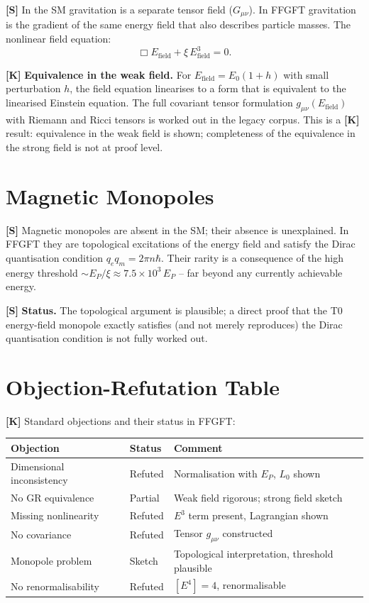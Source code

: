 \textbf{[S]} In the SM gravitation is a separate tensor field ($G_{\mu\nu}$). In
FFGFT gravitation is the gradient of the same energy field that also describes
particle masses. The nonlinear field equation:
\[
  \Box E_\text{field} + \xi\,E_\text{field}^3 = 0.
\]

\textbf{[K]} \textbf{Equivalence in the weak field.} For $E_\text{field}=E_0(1+h)$
with small perturbation $h$, the field equation linearises to a form that is
equivalent to the linearised Einstein equation. The full covariant tensor
formulation $g_{\mu\nu}(E_\text{field})$ with Riemann and Ricci tensors is worked
out in the legacy corpus. This is a \textbf{[K]} result: equivalence in the weak
field is shown; completeness of the equivalence in the strong field is not at
proof level.

\section{Magnetic Monopoles}

\textbf{[S]} Magnetic monopoles are absent in the SM; their absence is unexplained.
In FFGFT they are topological excitations of the energy field and satisfy the Dirac
quantisation condition $q_e q_m = 2\pi n\hbar$. Their rarity is a consequence of
the high energy threshold $\sim E_P/\xi\approx7{.}5\times10^3\,E_P$ -- far beyond
any currently achievable energy.

\textbf{[S]} \textbf{Status.} The topological argument is plausible; a direct
proof that the T0 energy-field monopole exactly satisfies (and not merely
reproduces) the Dirac quantisation condition is not fully worked out.

\section{Objection-Refutation Table}

\textbf{[K]} Standard objections and their status in FFGFT:

\begin{center}
\renewcommand{\arraystretch}{1.3}
{\small\setlength\tabcolsep{4pt}
\begin{tabular}{p{5.5cm}lp{5cm}}
\toprule
Objection & Status & Comment \\
\midrule
Dimensional inconsistency & Refuted & Normalisation with $E_P$, $L_0$ shown \\
No GR equivalence & Partial & Weak field rigorous; strong field sketch \\
Missing nonlinearity & Refuted & $E^3$ term present, Lagrangian shown \\
No covariance & Refuted & Tensor $g_{\mu\nu}$ constructed \\
Monopole problem & Sketch & Topological interpretation, threshold plausible \\
No renormalisability & Refuted & $[E^4]=4$, renormalisable \\
\bottomrule
\end{tabular}
}
\renewcommand{\arraystretch}{1.0}
\end{center}

